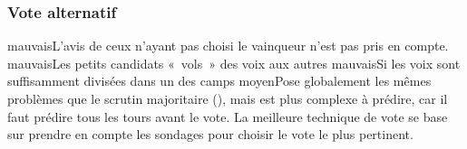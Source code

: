 \documentclass[../report]{subfiles}
\begin{document}
  \subsubsection{Vote alternatif}
  \tabcritere%
    {mauvais}{L'avis de ceux n'ayant pas choisi le vainqueur n'est pas pris en compte.}%
    {mauvais}{Les petits candidats «~vols~» des voix aux autres}%
    {mauvais}{Si les voix sont suffisamment divisées dans un des camps}%
    {moyen}{Pose globalement les mêmes problèmes que le scrutin majoritaire (), mais est plus complexe à prédire, car il faut prédire tous les tours avant le vote. La meilleure technique de vote se base sur prendre en compte les sondages pour choisir le vote le plus pertinent.}


  
\end{document}

